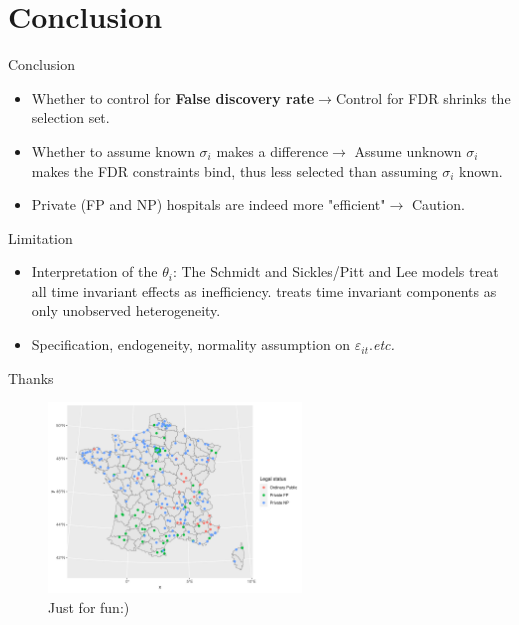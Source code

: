 \documentclass[10pt,mathserif,aspectratio=169]{beamer}
\begin{document}
\section{Conclusion}

\begin{frame}{Conclusion}
  \begin{itemize}
    \item Whether to control for \textbf{False discovery rate}$\rightarrow$Control for
          FDR shrinks the selection set.
    \item Whether to assume known $\sigma_i$ makes a difference$\rightarrow$ Assume
          unknown $\sigma_i$ makes the FDR constraints bind, thus less selected than
          assuming $\sigma_i$ known.
    \item Private (FP and NP) hospitals are indeed more "efficient"$\rightarrow$ Caution.
  \end{itemize}
\end{frame}

\begin{frame}[label=limitation]{Limitation}
  \begin{itemize}\itemsep=12pt
    \item Interpretation of the $\theta_i$: The Schmidt and Sickles/Pitt and Lee models
          treat all time invariant effects as inefficiency. \citet{greene2005fixed}
          treats time invariant components as only unobserved heterogeneity.
    \item Specification, endogeneity, normality assumption on
          $\varepsilon_{it}$.\textit{etc.} \hyperlink{normality}{} \end{itemize}
\end{frame}

\begin{frame}{Thanks}
  \begin{figure}
    \centering
    \includegraphics[width=0.6\textwidth]{../../Figures/2013-2022/Maps/Map.pdf}
    \caption{Just for fun:)}
  \end{figure}
\end{frame}
\end{document}
